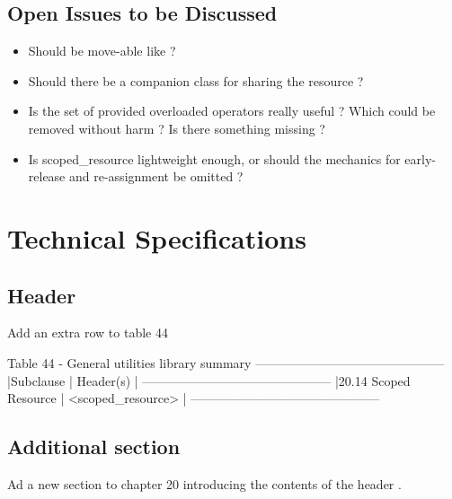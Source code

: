 \documentclass[ebook,11pt,article]{memoir}
\begin{document}
\section{Open Issues to be Discussed}
\begin{itemize}
\item Should  be move-able like  ?
\item Should there be a companion class for sharing the resource  ? 
\item Is the set of provided overloaded operators really useful ? Which could be removed without harm ? Is there something missing ?
\item Is scoped_resource lightweight enough, or should the mechanics for early-release and re-assignment be omitted ?
\end{itemize}


\chapter{Technical Specifications}
\section{Header}
Add an extra row to table 44 
\begin{codeblock}
Table 44 - General utilities library summary
---------------------------------------------
|Subclause             |  Header(s)         |
---------------------------------------------
|20.14 Scoped Resource | <scoped_resource>  |
---------------------------------------------
\end{codeblock}

\section{Additional section}
Ad a new section to chapter 20 introducing the contents of the header .
\end{document}
